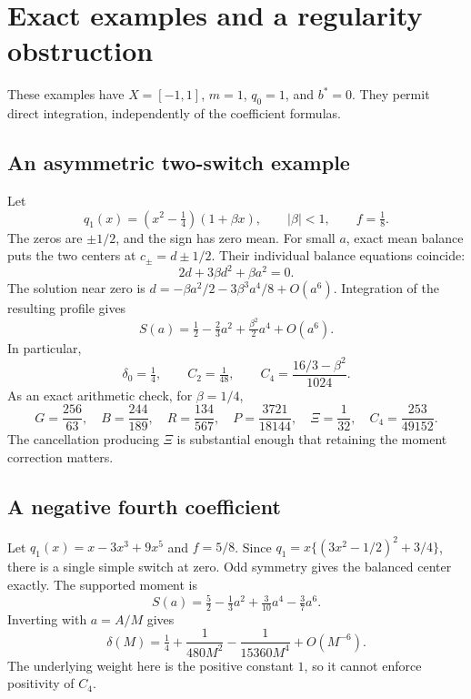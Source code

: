 \section{Exact examples and a regularity obstruction}\label{sec:examples}
These examples have \(X=[-1,1]\), \(m=1\), \(q_0=1\), and \(b^*=0\).
They permit direct integration, independently of the coefficient formulas.

\subsection{An asymmetric two-switch example}
Let
\[
 q_1(x)=(x^2-\tfrac14)(1+\beta x),\qquad |\beta|<1,\qquad f=\tfrac18 .
\]
The zeros are \(\pm1/2\), and the sign has zero mean.
For small \(a\), exact mean balance puts the two centers at
\(c_\pm=d\pm1/2\). Their individual balance equations coincide:
\[
 2d+3\beta d^2+\beta a^2=0 .
\]
The solution near zero is
\(d=-\beta a^2/2-3\beta^3a^4/8+O(a^6)\).
Integration of the resulting profile gives
\[
 S(a)=\tfrac12-\tfrac23a^2+\tfrac{\beta^2}{2}a^4+O(a^6).
\]
In particular,
\begin{equation}\label{eq:exampleone}
 \delta_0=\tfrac14,\qquad C_2=\tfrac1{48},\qquad
 C_4=\frac{16/3-\beta^2}{1024}.
\end{equation}
As an exact arithmetic check, for \(\beta=1/4\),
\[
 G=\frac{256}{63},\quad B=\frac{244}{189},\quad
 R=\frac{134}{567},\quad P=\frac{3721}{18144},\quad
 \Xi=\frac1{32},\quad C_4=\frac{253}{49152}.
\]
The cancellation producing \(\Xi\) is substantial enough that retaining
the moment correction matters.

\subsection{A negative fourth coefficient}
Let \(q_1(x)=x-3x^3+9x^5\) and \(f=5/8\).
Since \(q_1=x\{(3x^2-1/2)^2+3/4\}\), there is a single simple switch
at zero. Odd symmetry gives the balanced center exactly.
The supported moment is
\[
 S(a)=\tfrac52-\tfrac13a^2+\tfrac3{10}a^4-\tfrac37a^6.
\]
Inverting with \(a=A/M\) gives
\begin{equation}\label{eq:examplenegative}
 \delta(M)=\tfrac14+\frac1{480M^2}
                        -\frac1{15360M^4}+O(M^{-6}).
\end{equation}
The underlying weight here is the positive constant \(1\), so it cannot
enforce positivity of \(C_4\).

